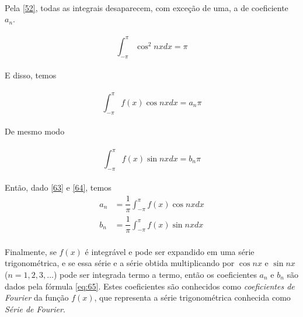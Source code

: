 \documentclass{article}
\begin{document}
\\
Pela \ref{52}, todas as integrais desaparecem, com exceção de uma, a de coeficiente $a_n$.\\
\\
\begin{equation}
    \int_{-\pi}^{\pi}\cos^2{nx}dx = \pi
\end{equation}
\\ 
E disso, temos\\
\\
\begin{equation}
\label{63}
    \int_{-\pi}^{\pi}f(x)\cos{nx}dx = a_n\pi
\end{equation}
\\
De mesmo modo\\
\\
\begin{equation}
\label{64}
    \int_{-\pi}^{\pi}f(x)\sin{nx}dx = b_n\pi
\end{equation}
\\
Então, dado \ref{63} e \ref{64}, temos\\
\begin{equation}
\label{eq:65}
    \begin{split}
        a_n &= \dfrac{1}{\pi}\int_{-\pi}^{\pi}f(x)\cos{nx}dx\\
        b_n &= \dfrac{1}{\pi}\int_{-\pi}^{\pi}f(x)\sin{nx}dx
    \end{split}
\end{equation}
\\
Finalmente, se $f(x)$ é integrável e pode ser expandido em uma série trigonométrica,
e se essa série e a série obtida multiplicando por $\cos{nx}$ e $\sin{nx}$ ($n = 1, 2, 3, ...$)
pode ser integrada termo a termo, então os coeficientes $a_n$ e $b_n$ são dados pela
fórmula \ref{eq:65}. Estes coeficientes são conhecidos como \textit{coeficientes de Fourier}
da função $f(x)$, que representa a série trigonométrica conhecida como \textit{Série de
Fourier}.\\
\end{document}
